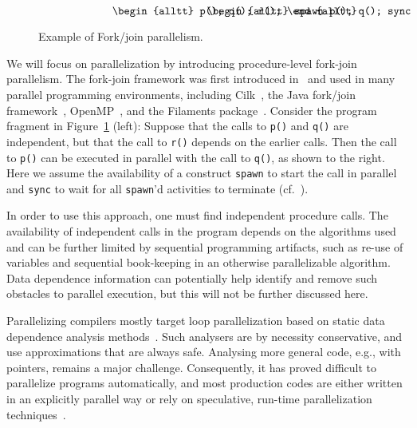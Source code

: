 \documentclass{acm_proc_article-sp}
\begin{document}
\begin{figure}
\small
\hrulefill
\[
\begin{minipage}[t]{3cm}
\begin{alltt}
   p();
   q();
   r();
\end{alltt}
\end{minipage}
\begin{minipage}[t]{3cm}
\begin{alltt}
   spawn p();
   q();
   sync;
   r();
\end{alltt}
\end{minipage} 
\]
\hrulefill
\caption{Example of Fork/join parallelism.}
\label{fforkjoin}
\end{figure}

We will focus on parallelization by introducing procedure-level
fork-join parallelism. The fork-join framework was first introduced
in~\cite{Conway63} and used in many parallel programming environments,
including Cilk~\cite{BJKLR96}, the Java fork/join
framework~\cite{Lea00}, OpenMP~\cite{DM98}, and the Filaments
package~\cite{LF00}. Consider the program fragment in
Figure~\ref{fforkjoin} (left):
Suppose that the calls to {\tt p()} and {\tt q()} are independent,
but that the call to {\tt r()} depends on the earlier calls. Then
the call to {\tt p()} can be
executed in parallel with
the call to {\tt q()}, as shown to the right.
Here we assume the availability of a construct {\tt spawn} to start
the call in parallel and {\tt sync} to wait for all {\tt spawn}'d
activities to terminate (cf.~\cite{BJKLR96}).

In order to use this approach, one must find independent
procedure calls.  The availability of independent
calls in the program depends on the algorithms used and can be further
limited by sequential programming artifacts, such as re-use of
variables and sequential book-keeping in an otherwise parallelizable
algorithm.  Data dependence information can potentially help
identify and remove such obstacles to parallel execution, but this
will not be further discussed here.

Parallelizing compilers mostly target loop parallelization based on
static data dependence analysis methods~\cite{KA02}.  Such analysers are
by necessity conservative, and use
approximations that are always safe.  
Analysing more general code, e.g., with pointers, remains a major
challenge.  Consequently, it has proved difficult to
parallelize programs automatically, and most production codes are either
written in an explicitly parallel way or rely on speculative, run-time
parallelization techniques~\cite{PO03,CL03}.
\end{document}
